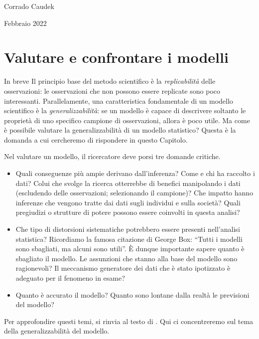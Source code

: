 \documentclass[
  10pt,
  italian,
  a4paper,
  extrafontsizes,onecolumn,openright
  ]{memoir}
\newenvironment{Summary}
  {\begin{bclogo}[logo=\bctrombone, noborder=true, couleur=lightgray!50]{In breve}\parindent0pt}
  {\end{bclogo}}
\theoremstyle{definition}
\theoremstyle{definition}
\theoremstyle{definition}
\theoremstyle{definition}
\theoremstyle{remark}
\begin{document}
\bigskip

Corrado Caudek

\bigskip

Febbraio 2022

\mainmatter

\hypertarget{loo-stan}{%
\chapter{Valutare e confrontare i modelli}\label{loo-stan}}

\begin{Summary}
Il principio base del metodo scientifico è la \emph{replicabilità} delle
osservazioni: le osservazioni che non possono essere replicate sono poco
interessanti. Parallelamente, una caratteristica fondamentale di un
modello scientifico è la \emph{generalizzabilità}: se un modello è
capace di descrivere soltanto le proprietà di uno specifico campione di
osservazioni, allora è poco utile. Ma come è possibile valutare la
generalizzabilità di un modello statistico? Questa è la domanda a cui
cercheremo di rispondere in questo Capitolo.
\end{Summary}

Nel valutare un modello, il ricercatore deve porsi tre domande critiche.

\begin{itemize}
\item
  Quali conseguenze più ampie derivano dall'inferenza? Come e chi ha raccolto i dati? Colui che svolge la ricerca otterrebbe di benefici manipolando i dati (escludendo delle osservazioni; selezionando il campione)? Che impatto hanno inferenze che vengono tratte dai dati sugli individui e sulla società? Quali pregiudizi o strutture di potere possono essere coinvolti in questa analisi?
\item
  Che tipo di distorsioni sistematiche potrebbero essere presenti nell'analisi statistica? Ricordiamo la famosa citazione di George Box: ``Tutti i modelli sono sbagliati, ma alcuni sono utili''. È dunque importante sapere quanto è sbagliato il modello. Le assunzioni che stanno alla base del modello sono ragionevoli? Il meccanismo generatore dei dati che è stato ipotizzato è adeguato per il fenomeno in esame?
\item
  Quanto è accurato il modello? Quanto sono lontane dalla realtà le previsioni del modello?
\end{itemize}

Per approfondire questi temi, si rinvia al testo di \textcite{Johnson2022bayesrules}. Qui ci concentreremo sul tema della generalizzabilità del modello.
\end{document}
